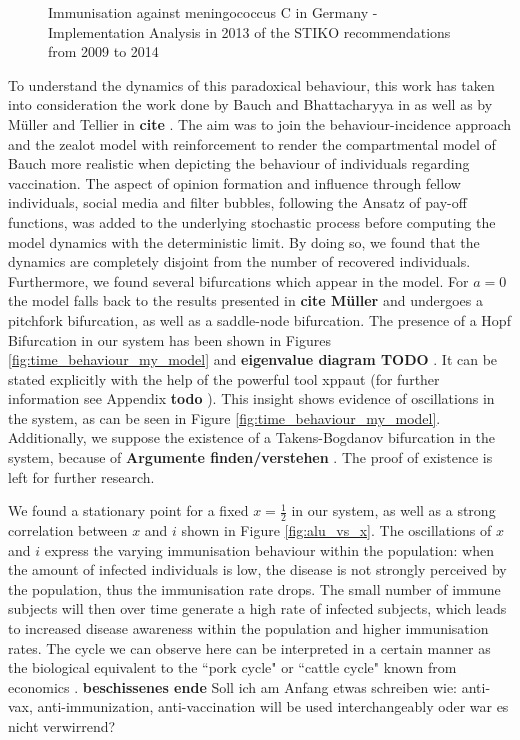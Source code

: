 \documentclass[12pt,a4paper,twoside]{article}
\begin{document}
\begin{figure}[h!]
	\centering
	\caption{Immunisation against meningococcus C in Germany - Implementation Analysis in 2013 of the \ac{STIKO} recommendations from 2009 to 2014 \cite{LamegoGreinerMGoffrierB2016}}
	\label{fig:impfkarte_meningokokken}
	\def\svgwidth{350pt}
	
\end{figure}

To understand the dynamics of this paradoxical behaviour, this work has taken into consideration the work done by Bauch and Bhattacharyya in \cite{Bauch2012} as well as by M\"uller and Tellier in \textbf{cite}%
. The aim was to join the behaviour-incidence approach and the zealot model with reinforcement to render the compartmental model of Bauch more realistic when depicting the behaviour of individuals regarding vaccination. The aspect of opinion formation and influence through fellow individuals, social media and filter bubbles, following the Ansatz of pay-off functions, was added to the underlying stochastic process before computing the model dynamics with the deterministic limit. By doing so, we found that the dynamics are completely disjoint from the number of recovered individuals. Furthermore, we found several bifurcations which appear in the model. For $a=0$ the model falls back to the results presented in \textbf{cite Müller}%
and undergoes a pitchfork bifurcation, as well as a saddle-node bifurcation. The presence of a Hopf Bifurcation in our system has been shown in Figures \eqref{fig:time_behaviour_my_model} and \textbf{eigenvalue diagram TODO}%
 . It can be stated explicitly with the help of the powerful tool xppaut (for further information see Appendix \textbf{todo}%
 ). This insight shows evidence of oscillations in the system, as can be seen in Figure \eqref{fig:time_behaviour_my_model}. Additionally, we suppose the existence of a Takens-Bogdanov bifurcation in the system, because of \textbf{Argumente finden/verstehen}%
 . The proof of existence is left for further research. \newline
 
 We found a stationary point for a fixed $x = \frac{1}{2}$ in our system, as well as a strong correlation between $x$ and $i$ shown in Figure \eqref{fig:alu_vs_x}. The oscillations of $x$ and $i$ express the varying immunisation behaviour within the population: when the amount of infected individuals is low, the disease is not strongly perceived by the population, thus the immunisation rate drops. The small number of immune subjects will then over time generate a high rate of infected subjects, which leads to increased disease awareness within the population and higher immunisation rates. The cycle we can observe here can be interpreted in a certain manner as the biological equivalent to the ``pork cycle" or ``cattle cycle" known from economics \cite{Rosen1994}. \textbf{beschissenes ende}\newline\newline
 Soll ich am Anfang etwas schreiben wie: anti-vax, anti-immunization, anti-vaccination will be used interchangeably oder war es nicht verwirrend?

\newpage

\printbibliography

%
\end{document}
